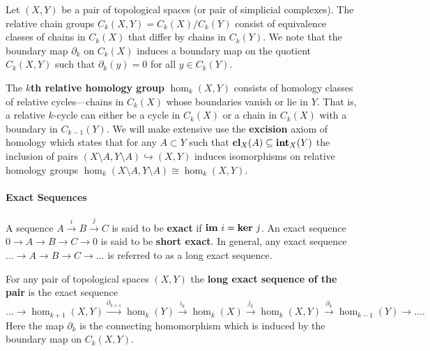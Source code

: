 Let $(X, Y)$ be a pair of topological spaces (or pair of simplicial complexes).
The relative chain groups $C_k(X, Y) = C_k(X) / C_k(Y)$ consist of equivalence classes of chains in $C_k(X)$ that differ by chains in $C_k(Y)$.
We note that the boundary map $\partial_k$ on $C_k(X)$ induces a boundary map on the quotient $C_k(X, Y)$ such that $\partial_k(y) = 0$ for all $y\in C_k(Y)$.

The \textbf{$k$th relative homology group} $\hom_k(X, Y)$ consists of homology classes of relative cycles---chains in $C_k(X)$ whose boundaries vanish or lie in $Y$.
That is, a relative $k$-cycle can either be a cycle in $C_k(X)$ or a chain in $C_k(X)$ with a boundary in $C_{k-1}(Y)$.
We will make extensive use the \textbf{excision} axiom of homology which states that for any $A\subset Y$ such that $\mathbf{cl}_X(A)\subseteq \mathbf{int}_X(Y)$ the inclusion of pairs $(X\setminus A, Y\setminus A)\hookrightarrow (X, Y)$ induces isomorphisms on relative homology groups $\hom_k(X\setminus A, Y\setminus A)\cong\hom_k(X, Y)$.

\paragraph{Exact Sequences}

A sequence $A\xrightarrow{i} B\xrightarrow{j} C$ is said to be \textbf{exact} if $\mathbf{im}~i = \mathbf{ker}~j$.
An exact sequence $0\to A\to B\to C\to 0$ is said to be \textbf{short exact}.
In general, any exact sequence $\ldots\to A\to B\to C\to\ldots$ is referred to as a long exact sequence.

For any pair of topological spaces $(X, Y)$ the \textbf{long exact sequence of the pair} is the exact sequence
\[ \ldots\to\hom_{k+1}(X, Y)\xrightarrow{\partial_{k+1}} \hom_k(Y)\xrightarrow{i_k} \hom_k(X)\xrightarrow{j_k}\hom_k(X, Y)\xrightarrow{\partial_k}\hom_{k-1}(Y)\to\ldots.\]
Here the map $\partial_k$ is the connecting homomorphism which is induced by the boundary map on $C_k(X, Y)$.


